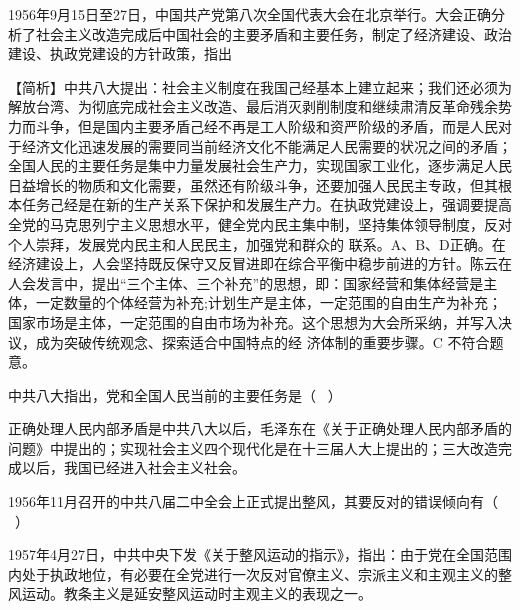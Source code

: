 \question 1956年9月15日至27日，中国共产党第八次全国代表大会在北京举行。大会正确分析了社会主义改造完成后中国社会的主要矛盾和主要任务，制定了经济建设、政治建设、执政党建设的方针政策，指出
\par{}
\begin{solution}【简析】中共八大提出：社会主义制度在我国己经基本上建立起来；我们还必须为解放台湾、为彻底完成社会主义改造、最后消灭剥削制度和继续肃清反革命残余势力而斗争，但是国内主要矛盾己经不再是工人阶级和资严阶级的矛盾，而是人民对于经济文化迅速发展的需要同当前经济文化不能满足人民需要的状况之间的矛盾；全国人民的主要任务是集中力量发展社会生产力，实现国家工业化，逐步满足人民日益增长的物质和文化需要，虽然还有阶级斗争，还要加强人民民主专政，但其根本任务己经是在新的生产关系下保护和发展生产力。在执政党建设上，强调要提高全党的马克思列宁主义思想水平，健全党内民主集中制，坚持集体领导制度，反对个人崇拜，发展党内民主和人民民主，加强党和群众的
联系。A、B、D正确。在经济建设上，人会坚持既反保守又反冒进即在综合平衡中稳步前进的方针。陈云在人会发言中，提出``三个主体、三个补充''的思想，即：国家经营和集体经营是主体，一定数量的个体经营为补充;计划生产是主体，一定范围的自由生产为补充；国家市场是主体，一定范围的自由市场为补充。这个思想为大会所采纳，并写入决议，成为突破传统观念、探索适合中国特点的经
济体制的重要步骤。C 不符合题意。
\end{solution}
\question 中共八大指出，党和全国人民当前的主要任务是（ ~）
\par{}
\begin{solution}正确处理人民内部矛盾是中共八大以后，毛泽东在《关于正确处理人民内部矛盾的问题》中提出的；实现社会主义四个现代化是在十三届人大上提出的；三大改造完成以后，我国已经进入社会主义社会。
\end{solution}
\question 1956年11月召开的中共八届二中全会上正式提出整风，其要反对的错误倾向有（
~）
\par{}
\begin{solution}1957年4月27日，中共中央下发《关于整风运动的指示》，指出：由于党在全国范围内处于执政地位，有必要在全党进行一次反对官僚主义、宗派主义和主观主义的整风运动。教条主义是延安整风运动时主观主义的表现之一。
\end{solution}
